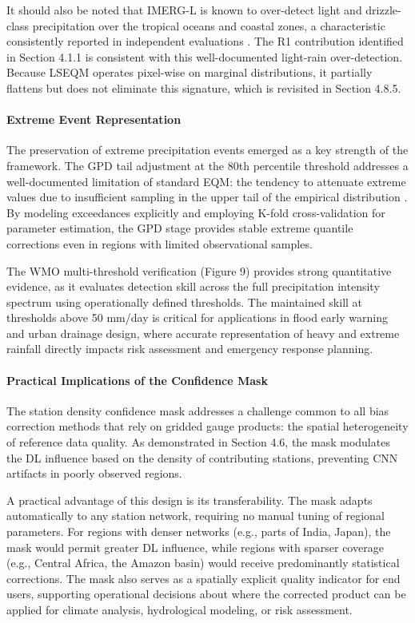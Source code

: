 \documentclass[11pt,a4paper]{article}
\begin{document}
It should also be noted that IMERG-L is known to over-detect light and
drizzle-class precipitation over the tropical oceans and coastal zones,
a characteristic consistently reported in independent evaluations
\cite{ref31,ref32}. The R1 contribution identified in Section 4.1.1 is
consistent with this well-documented light-rain over-detection. Because
LSEQM operates pixel-wise on marginal distributions, it partially
flattens but does not eliminate this signature, which is revisited in
Section 4.8.5.

\paragraph{Extreme Event
Representation}\label{extreme-event-representation}

The preservation of extreme precipitation events emerged as a key
strength of the framework. The GPD tail adjustment at the 80th
percentile threshold addresses a well-documented limitation of standard
EQM: the tendency to attenuate extreme values due to insufficient
sampling in the upper tail of the empirical distribution \cite{ref11}. By
modeling exceedances explicitly and employing K-fold cross-validation
for parameter estimation, the GPD stage provides stable extreme quantile
corrections even in regions with limited observational samples.

The WMO multi-threshold verification (Figure 9) provides strong
quantitative evidence, as it evaluates detection skill across the full
precipitation intensity spectrum using operationally defined thresholds.
The maintained skill at thresholds above 50 mm/day is critical for
applications in flood early warning and urban drainage design, where
accurate representation of heavy and extreme rainfall directly impacts
risk assessment and emergency response planning.

\paragraph{Practical Implications of the Confidence
Mask}

The station density confidence mask addresses a challenge common to all
bias correction methods that rely on gridded gauge products: the spatial
heterogeneity of reference data quality. As demonstrated in Section 4.6,
the mask modulates the DL influence based on the density of contributing
stations, preventing CNN artifacts in poorly observed regions.

A practical advantage of this design is its transferability. The mask
adapts automatically to any station network, requiring no manual tuning
of regional parameters. For regions with denser networks (e.g., parts of
India, Japan), the mask would permit greater DL influence, while regions
with sparser coverage (e.g., Central Africa, the Amazon basin) would
receive predominantly statistical corrections. The mask also serves as a
spatially explicit quality indicator for end users, supporting
operational decisions about where the corrected product can be applied
for climate analysis, hydrological modeling, or risk assessment.
\end{document}
